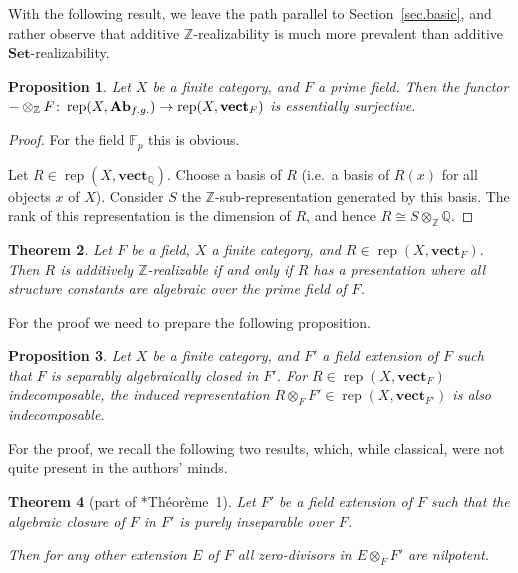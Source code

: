 \documentclass[a4paper]{amsart}
\theoremstyle{plain}
\newtheorem{theorem}{Theorem}[section]
\newtheorem{proposition}[theorem]{Proposition}
\theoremstyle{definition}
\theoremstyle{remark}
\newcommand{\Set}{\mathbf{Set}}
\newcommand{\vect}{\mathbf{vect}}
\newcommand{\vectF}{\mathbf{vect}_F}
\newcommand{\Z}{\mathbb{Z}}
\DeclareMathOperator{\rep}{rep}
\begin{document}
With the following result, we leave the path parallel to Section~\ref{sec.basic}, and rather observe that additive \( \Z \)-realizability is much more prevalent than additive \( \Set \)-realizability.

\begin{proposition} \label{prop.ZRealizableOverPrime}
Let \( X \) be a finite category, and \( F \) a prime field. Then the functor \( - \otimes_{\Z} F \colon \rep(X, \mathbf{Ab}_{\rm f.g.}) \to \rep(X, \vectF) \) is essentially surjective.
\end{proposition}

\begin{proof}
For the field \( \mathbb{F}_p \) this is obvious.

Let \( R \in \rep(X, \vect_{\mathbb{Q}}) \). Choose a basis of \( R \) (i.e.\ a basis of \( R(x) \) for all objects \( x \) of \( X \)). Consider \( S \) the \( \Z \)-sub-representation generated by this basis. The rank of this representation is the dimension of \( R \), and hence \( R \cong S \otimes_{\Z} \mathbb{Q} \).
\end{proof}

\begin{theorem} \label{thm.char_of_Z_realizable}
Let \( F \) be a field, \( X \) a finite category, and \( R \in \rep(X, \vectF) \). Then \( R \) is additively \( \Z \)-realizable if and only if \( R \) has a presentation where all structure constants are algebraic over the prime field of \( F \).
\end{theorem}

For the proof we need to prepare the following proposition.

\begin{proposition} \label{prop.field_ext_preserve_indec}
Let \( X \) be a finite category, and \( F' \) a field extension of \( F \) such that \( F \) is separably algebraically closed in \( F' \). For \( R \in \rep(X, \vectF) \) indecomposable, the induced representation \( R \otimes_F F' \in \rep(X, \vect_{F'}) \) is also indecomposable.
\end{proposition}

For the proof, we recall the following two results, which, while classical, were not quite present in the authors' minds. 

\begin{theorem}[part of \cite{Cartier_Extensions regulieres}*{Théorème~1}] \label{thm.Cartier}
Let \( F' \) be a field extension of \( F \) such that the algebraic closure of \( F \) in \( F' \) is purely inseparable over \( F \).

Then for any other extension \( E \) of \( F \) all zero-divisors in \( E \otimes_F F' \) are nilpotent.
\end{theorem}
\end{document}
